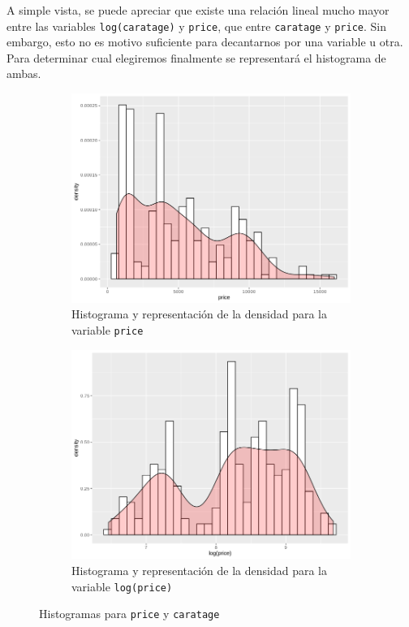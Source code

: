 \documentclass[a4paper, 9pt]{article}
\begin{document}
A simple vista, se puede apreciar que existe una relación lineal mucho mayor entre las variables \texttt{log(caratage)} y \texttt{price}, que entre \texttt{caratage} y \texttt{price}. Sin embargo, esto no es motivo suficiente para decantarnos por una variable u otra. Para determinar cual elegiremos finalmente se representará el histograma de ambas.

\begin{figure}[h!]
  \centering
  \begin{subfigure}[b]{0.35\linewidth}
    \includegraphics[width=\linewidth]{report/images/question-1/histogram-price.png}
    \caption{Histograma y representación de la densidad para la variable \texttt{price}}
  \end{subfigure}
  \begin{subfigure}[b]{0.35\linewidth}
    \includegraphics[width=\linewidth]{report/images/question-1/histogram-logprice.png}
    \caption{Histograma y representación de la densidad para la variable \texttt{log(price)}}
  \end{subfigure}
  \caption{Histogramas para \texttt{price} y \texttt{caratage}}
  \label{fig:coffee}
\end{figure}
\end{document}
